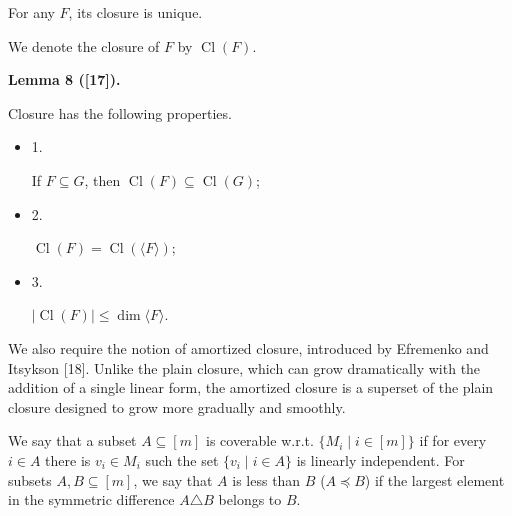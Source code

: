 For any $F$, its closure is unique.\par




We denote the closure of $F$ by $\operatorname{Cl}(F)$.\par



\par\medskip\noindent\textbf{
Lemma 8 ([17]).
}\par



Closure has the following properties.\par


\begin{itemize}


\item 
1. 


If $F\subseteq G$, then $\operatorname{Cl}(F)\subseteq\operatorname{Cl}(G)$;\par





\item 
2. 


$\operatorname{Cl}(F)=\operatorname{Cl}(\langle F\rangle)$;\par





\item 
3. 


$|\operatorname{Cl}(F)|\leq\dim\langle F\rangle$.\par





\end{itemize}




We also require the notion of amortized closure, introduced by Efremenko and Itsykson [18].
Unlike the plain closure, which can grow dramatically with the addition of a single linear form,
the amortized closure is a superset of the plain closure designed to grow more gradually and smoothly.\par



We say that a subset $A\subseteq[m]$ is coverable w.r.t. $\{M_{i}\mid i\in[m]\}$
if for every $i\in A$ there is $v_{i}\in M_{i}$ such the set $\{v_{i}\mid i\in A\}$ is linearly independent.
For subsets $A,B\subseteq[m]$, we say that $A$ is less than $B$ ($A\preceq B$)
if the largest element in the symmetric difference $A\triangle B$ belongs to $B$.\par



